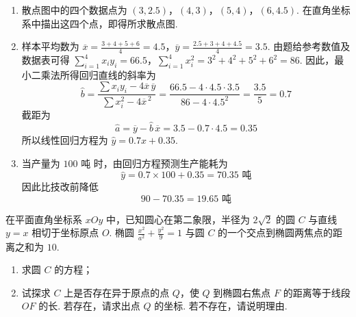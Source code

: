 \begin{solution}
\begin{enumerate}
\item 散点图中的四个数据点为 \((3,2.5)\)，\((4,3)\)，\((5,4)\)，\((6,4.5)\). 在直角坐标系中描出这四个点，即得所求散点图.

\item 样本平均数为 \(\overline{x}=\frac{3+4+5+6}{4}=4.5\)，\(\overline{y}=\frac{2.5+3+4+4.5}{4}=3.5\). 由题给参考数值及数据表可得 \(\sum_{i=1}^{4}x_i y_i=66.5\)，\(\sum_{i=1}^{4}x_i^2=3^2+4^2+5^2+6^2=86\).
因此，最小二乘法所得回归直线的斜率为
\[
\widehat{b}=\frac{\sum x_i y_i-4\overline{x}\,\overline{y}}{\sum x_i^2-4\overline{x}^{\,2}}=\frac{66.5-4\cdot4.5\cdot3.5}{86-4\cdot4.5^2}=\frac{3.5}{5}=0.7
\]
截距为
\[
\widehat{a}=\overline{y}-\widehat{b}\,\overline{x}=3.5-0.7\cdot4.5=0.35
\]
所以线性回归方程为 \(\widehat{y}=0.7x+0.35\).

\item 当产量为 \(100\text{ 吨}\) 时，由回归方程预测生产能耗为
\[
\widehat{y}=0.7\times100+0.35=70.35\text{ 吨}
\]
因此比技改前降低
\[
90-70.35=19.65\text{ 吨}
\]
\end{enumerate}
\end{solution}

\begin{problem}
在平面直角坐标系 \(xOy\) 中，已知圆心在第二象限，半径为 \(2\sqrt{2}\) 的圆 \(C\) 与直线 \(y = x\) 相切于坐标原点 \(O\). 椭圆 \(\frac{x^2}{a^2} + \frac{y^2}{9} = 1\) 与圆 \(C\) 的一个交点到椭圆两焦点的距离之和为 \(10\).

\begin{enumerate}
\item 求圆 \(C\) 的方程；
\item 试探求 \(C\) 上是否存在异于原点的点 \(Q\)，使 \(Q\) 到椭圆右焦点 \(F\) 的距离等于线段 \(OF\) 的长. 若存在，请求出点 \(Q\) 的坐标. 若不存在，请说明理由.
\end{enumerate}
\end{problem}

